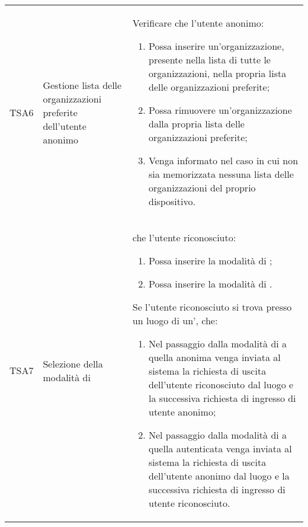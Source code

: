 {\begin{longtable}{ c  C{3cm}  C{11cm} }
TSA6 & Gestione lista delle organizzazioni preferite dell'utente anonimo &
Verificare che l'utente anonimo:
\begin{enumerate}
    \item Possa inserire un'organizzazione, presente nella lista di tutte le organizzazioni, nella propria lista delle organizzazioni preferite;
    \item Possa rimuovere un'organizzazione dalla propria lista delle organizzazioni preferite;
    \item Venga informato nel caso in cui non sia memorizzata nessuna lista delle organizzazioni del proprio dispositivo.
\end{enumerate} \\

TSA7 & Selezione della modalità di  & 
 che l'utente riconosciuto:
\begin{enumerate}
    \item Possa inserire la modalità di ;
    \item Possa inserire la modalità di .
\end{enumerate}
Se l'utente riconosciuto si trova presso un luogo di un',  che:
\begin{enumerate}[resume]
    \item Nel passaggio dalla modalità di  a quella anonima venga inviata al sistema la richiesta di uscita dell'utente riconosciuto dal luogo e la successiva richiesta di ingresso di utente anonimo;
    \item Nel passaggio dalla modalità di  a quella autenticata venga inviata al sistema la richiesta di uscita dell'utente anonimo dal luogo e la successiva richiesta di ingresso di utente riconosciuto.
\end{enumerate} \\


\end{longtable}}
